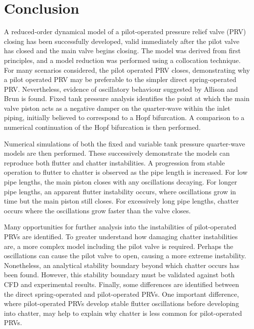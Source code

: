 \chapter{Conclusion}

A reduced-order dynamical model of a pilot-operated pressure relief valve (PRV) closing has been successfully developed, valid immediately after the pilot valve has closed and the main valve begins closing. The model was derived from first principles, and a model reduction was performed using a collocation technique. For many scenarios considered, the pilot operated PRV closes, demonstrating why a pilot operated PRV may be preferable to the simpler direct spring-operated PRV. Nevertheless, evidence of oscillatory behaviour suggested by Allison and Brun \cite{Allison2015TestingValves} is found. Fixed tank pressure analysis identifies the point at which the main valve piston acts as a negative damper on the quarter-wave within the inlet piping, initially believed to correspond to a Hopf bifurcation. A comparison to a numerical continuation of the Hopf bifurcation is then performed.

Numerical simulations of both the fixed and variable tank pressure quarter-wave models are then performed. These successively demonstrate the models can reproduce both flutter and chatter instabilities. A progression from stable operation to flutter to chatter is observed as the pipe length is increased. For low pipe lengths, the main piston closes with any oscillations decaying. For longer pipe lengths, an apparent flutter instability occurs, where oscillations grow in time but the main piston still closes. For excessively long pipe lengths, chatter occurs where the oscillations grow faster than the valve closes.

Many opportunities for further analysis into the instabilities of pilot-operated PRVs are identified. To greater understand how damaging chatter instabilities are, a more complex model including the pilot valve is required. Perhaps the oscillations can cause the pilot valve to open, causing a more extreme instability. Nonetheless, an analytical stability boundary beyond which chatter occurs has been found. However, this stability boundary must be validated against both CFD and experimental results. Finally, some differences are identified between the direct spring-operated and pilot-operated PRVs. One important difference, where pilot-operated PRVs develop stable flutter oscillations before developing into chatter, may help to explain why chatter is less common for pilot-operated PRVs.
